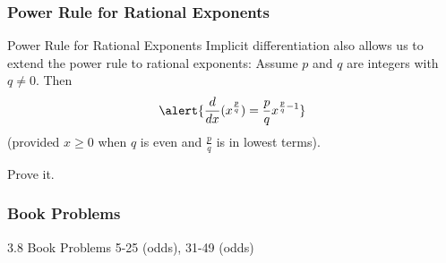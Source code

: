\documentclass[cal1spr16Lectures.tex]{subfiles}
\begin{document}
\subsubsection{Power Rule for Rational Exponents}

\begin{frame}{\small Power Rule for Rational Exponents}
Implicit differentiation also allows us to extend the power rule to rational exponents:  Assume $p$ and $q$ are integers with $q \neq 0$.  Then 
\[\alert{\frac{d}{dx} (x^{\frac{p}{q}})=\frac{p}{q} x^{\frac{p}{q}-1}}\]
(provided $x \geq 0$ when $q$ is even and $\textstyle\frac{p}{q}$ is in lowest terms).
\begin{exe}Prove it. \end{exe}
\end{frame}

\subsubsection{Book Problems}

\begin{frame}
\begin{block}{3.8 Book Problems} 5-25 (odds), 31-49 (odds) \end{block} 
\end{frame}

\end{document}
